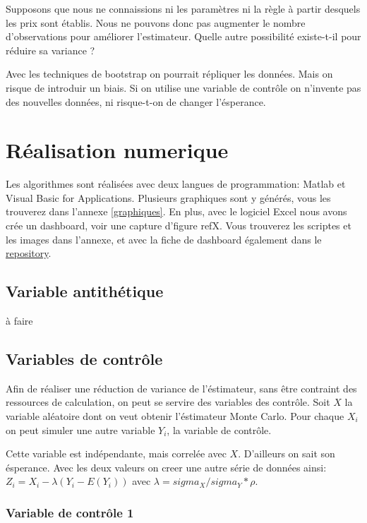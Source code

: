 \documentclass[a4paper,12pt]{scrartcl}
\begin{document}
Supposons que nous ne connaissions ni les paramètres ni la règle à partir desquels les prix sont établis. 
Nous ne pouvons donc pas augmenter le nombre d'observations pour améliorer l'estimateur.
Quelle autre possibilité existe-t-il pour réduire sa variance ?

Avec les techniques de bootstrap on pourrait répliquer les données. 
Mais on risque de introduir un biais.
Si on utilise une variable de contrôle on n'invente pas des nouvelles données, ni risque-t-on de changer l'ésperance.


\section{Réalisation numerique}

Les algorithmes sont réalisées avec deux langues de programmation: Matlab et Visual Basic for Applications.
Plusieurs graphiques sont y générés, vous les trouverez dans l'annexe \ref{graphiques}.
En plus, avec le logiciel Excel nous avons crée un dashboard, voir une capture d'figure ref{X}. 
Vous trouverez les scriptes et les images dans l'annexe, et avec la fiche de dashboard également dans le \href{https://github.com/matthias-10/UCO_actuariat_mini-projet}{repository}.


\subsection{Variable antithétique}

à faire

\subsection{Variables de contrôle}

Afin de réaliser une réduction de variance de l'éstimateur, sans être contraint des ressources de calculation, on peut se servire des variables des contrôle.
Soit $X$ la variable aléatoire dont on veut obtenir l'éstimateur Monte Carlo.
Pour chaque $X_i$ on peut simuler une autre variable $Y_i$, la variable de contrôle.

Cette variable est indépendante, mais correlée avec $X$.
D'ailleurs on sait son ésperance.
Avec les deux valeurs on creer une autre série de données ainsi:
$Z_i = X_i - \lambda(Y_i - E(Y_i))$ avec $\lambda = sigma_X/sigma_Y * \rho$.

\subsubsection{Variable de contrôle 1}
\end{document}
